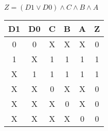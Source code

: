 
\begin{center}
    {\(Z = (D1 \lor D0) \land C \land B \land A \)}
    \begin{table}[h] %
        \begin{center}
            \begin{tabular}{|c|c|c|c|c||c|} \hline
            D1 & D0 & C & B & A & Z \\ \hline\hline
            0  & 0  & X & X & X & 0 \\ \hline
            1  & X  & 1 & 1 & 1 & 1 \\ \hline
            X  & 1  & 1 & 1 & 1 & 1 \\ \hline
            X  & X  & 0 & X & X & 0 \\ \hline
            X  & X  & X & 0 & X & 0 \\ \hline
            X  & X  & X & X & 0 & 0 \\ \hline
            \end{tabular}
        \end{center}
    \end{table}
\end{center}
